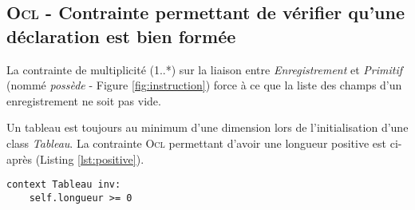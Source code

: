 
\subsection{\textsc{Ocl} - Contrainte permettant de vérifier qu'une déclaration est bien formée}
\label{sec:question12}

La contrainte de multiplicité (1..*) sur la liaison entre \emph{Enregistrement} et \emph{Primitif} (nommé \emph{possède} - Figure \ref{fig:instruction}) force à ce que la liste des champs d'un enregistrement ne soit pas vide.

Un tableau est toujours au minimum d'une dimension lors de l'initialisation d'une class \emph{Tableau}. La contrainte \textsc{Ocl} permettant d'avoir une longueur positive est ci-après (Listing \ref{lst:positive}).

\begin{lstlisting}[caption={Dimension strictement positive},captionpos=b,label={lst:positive},language=OCL]
context Tableau inv:
	self.longueur >= 0
\end{lstlisting}
